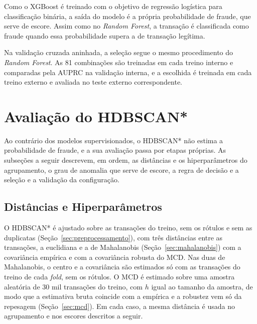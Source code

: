 \documentclass{uflamon}          %
\begin{document}
Como o XGBoost é treinado com o objetivo de regressão logística para classificação binária, a saída do modelo é a própria probabilidade de fraude, que serve de escore. Assim como no \textit{Random Forest}, a transação é classificada como fraude quando essa probabilidade supera a de transação legítima.

Na validação cruzada aninhada, a seleção segue o mesmo procedimento do \textit{Random Forest}. As 81 combinações são treinadas em cada treino interno e comparadas pela AUPRC na validação interna, e a escolhida é treinada em cada treino externo e avaliada no teste externo correspondente.

\section{Avaliação do HDBSCAN*}
\label{sec:avaliacao-hdbscan}

Ao contrário dos modelos supervisionados, o HDBSCAN* não estima a probabilidade de fraude, e a sua avaliação passa por etapas próprias. As subseções a seguir descrevem, em ordem, as distâncias e os hiperparâmetros do agrupamento, o grau de anomalia que serve de escore, a regra de decisão e a seleção e a validação da configuração.

\subsection{Distâncias e Hiperparâmetros}

O HDBSCAN* é ajustado sobre as transações do treino, sem os rótulos e sem as duplicatas (Seção~\ref{sec:preprocessamento}), com três distâncias entre as transações, a euclidiana e a de Mahalanobis (Seção~\ref{sec:mahalanobis}) com a covariância empírica e com a covariância robusta do MCD. Nas duas de Mahalanobis, o centro e a covariância são estimados só com as transações do treino de cada \textit{fold}, sem os rótulos. O MCD é estimado sobre uma amostra aleatória de 30 mil transações do treino, com $h$ igual ao tamanho da amostra, de modo que a estimativa bruta coincide com a empírica e a robustez vem só da repesagem (Seção~\ref{sec:mcd}). Em cada caso, a mesma distância é usada no agrupamento e nos escores descritos a seguir.
\end{document}
